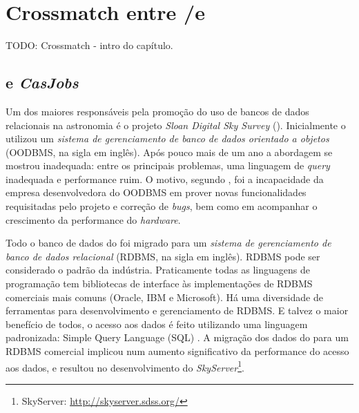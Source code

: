 


\chapter{Crossmatch entre \SDSS/\starlight e \galex}
\label{sec:Crossmatch}

TODO: Crossmatch - intro do capítulo.

\section{ e {\em CasJobs}}
Um dos maiores responsáveis pela promoção do uso de bancos de dados relacionais
na astronomia é o projeto {\em Sloan Digital Sky Survey} (\SDSS). Inicialmente o
\SDSS utilizou um {\em sistema de gerenciamento de banco de dados orientado a
objetos} (OODBMS, na sigla em inglês). Após pouco mais de um ano a abordagem se
mostrou inadequada: entre os principais problemas, uma linguagem de {\em query}
inadequada e performance ruim. O motivo, segundo \cite{Thakar2004}, foi a
incapacidade da empresa desenvolvedora do OODBMS em prover novas funcionalidades
requisitadas pelo projeto e correção de {\em bugs}, bem como em acompanhar o
crescimento da performance do {\em hardware}.

Todo o banco de dados do \SDSS foi migrado para um {\em sistema de gerenciamento
de banco de dados relacional} (RDBMS, na sigla em inglês). RDBMS pode ser
considerado o padrão da indústria. Praticamente todas as linguagens de
programação tem bibliotecas de interface às implementações de RDBMS comerciais
mais comuns (Oracle, IBM e Microsoft). Há uma diversidade de ferramentas para
desenvolvimento e gerenciamento de RDBMS. E talvez o maior benefício de todos, o
acesso aos dados é feito utilizando uma linguagem padronizada: Simple Query
Language (SQL) \citep{Codd1970}. A migração dos dados do \SDSS para um RDBMS
comercial implicou num aumento significativo da performance do acesso aos dados,
e resultou no desenvolvimento do {\em SkyServer}\footnote{SkyServer:
\url{http://skyserver.sdss.org/}}.

